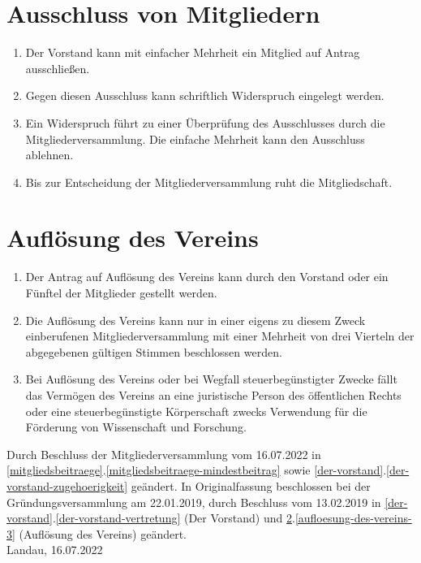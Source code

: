 \documentclass[a4paper, 12pt]{scrartcl}
\begin{document}
\section{Ausschluss von Mitgliedern}
\begin{enumerate}
	\item Der Vorstand kann mit einfacher Mehrheit ein Mitglied auf Antrag ausschließen.
	\item Gegen diesen Ausschluss kann schriftlich Widerspruch eingelegt werden.
	\item Ein Widerspruch führt zu einer Überprüfung des Ausschlusses durch die Mitgliederversammlung. Die einfache Mehrheit kann den Ausschluss ablehnen.
	\item Bis zur Entscheidung der Mitgliederversammlung ruht die Mitgliedschaft.
\end{enumerate}

\section{Auflösung des Vereins}
\label{aufloesung-des-vereins}
\begin{enumerate}
	\item Der Antrag auf Auflösung des Vereins kann durch den Vorstand oder ein Fünftel der Mitglieder gestellt werden.
	\item Die Auflösung des Vereins kann nur in einer eigens zu diesem Zweck einberufenen Mitgliederversammlung mit einer Mehrheit von drei Vierteln der abgegebenen gültigen Stimmen beschlossen werden.
	\item \label{aufloesung-des-vereins-3} Bei Auflösung des Vereins oder bei Wegfall steuerbegünstigter Zwecke fällt das Vermögen des Vereins an eine juristische Person des öffentlichen Rechts oder eine steuerbegünstigte Körperschaft zwecks Verwendung für die Förderung von Wissenschaft und Forschung.
\end{enumerate}

\vspace{2.5cm}

\noindent Durch Beschluss der Mitgliederversammlung vom 16.07.2022 in \ref{mitgliedsbeitraege}.\ref{mitgliedsbeitraege-mindestbeitrag} sowie \ref{der-vorstand}.\ref{der-vorstand-zugehoerigkeit} geändert. In Originalfassung beschlossen bei der Gründungsversammlung am 22.01.2019, durch Beschluss vom 13.02.2019 in \ref{der-vorstand}.\ref{der-vorstand-vertretung} (Der Vorstand) und \ref{aufloesung-des-vereins}.\ref{aufloesung-des-vereins-3} (Auflösung des Vereins) geändert.\\[0.5cm]

\noindent Landau, 16.07.2022
\end{document}
